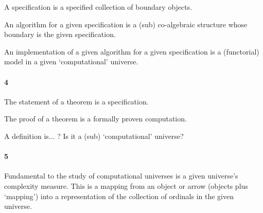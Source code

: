 A specification is a specified collection of boundary objects.

An algorithm for a given specification is a (sub) co-algebraic structure whose
boundary is the given specification.

An implementation of a given algorithm for a given specification is a
(functorial) model in a given `computational' universe.

\paragraph{4}

The statement of a theorem is a specification.

The proof of a theorem is a formally proven computation.

A definition is... ? Is it a (sub) `computational' universe?

\paragraph{5}

Fundamental to the study of computational universes is a given universe's
complexity measure. This is a mapping from an object or arrow (objects plus
`mapping') into a representation of the collection of ordinals in the given
universe.
